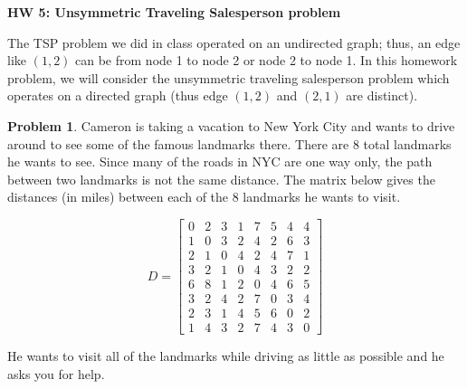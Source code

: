 \documentclass[11pt]{article}
\theoremstyle{definition}
\newtheorem{problem}{Problem}
\begin{document}
\begin{large}
\begin{center}
\textbf{HW 5: Unsymmetric Traveling Salesperson problem}
\end{center}
\end{large}

The TSP problem we did in class operated on an undirected graph; thus, an edge like $(1,2)$ can be from node 1 to node 2 or node 2 to node 1. In this homework problem, we will consider the unsymmetric traveling salesperson problem which operates on a directed graph (thus edge $(1,2)$ and $(2,1)$ are distinct).

\begin{problem}
Cameron is taking a vacation to New York City and wants to drive around to see some of the famous landmarks there. There are 8 total landmarks he wants to see. Since many of the roads in NYC are one way only, the path between two landmarks is not the same distance. The matrix below gives the distances (in miles) between each of the 8 landmarks he wants to visit.

\[
D = 
\begin{bmatrix}
0 & 2 & 3 & 1 & 7 & 5 & 4 & 4\\
1 & 0 & 3 & 2 & 4 & 2 & 6 & 3\\
2 & 1 & 0 & 4 & 2 & 4 & 7 & 1\\
3 & 2 & 1 & 0 & 4 & 3 & 2 & 2\\
6 & 8 & 1 & 2 & 0 & 4 & 6 & 5\\
3 & 2 & 4 & 2 & 7 & 0 & 3 & 4\\
2 & 3 & 1 & 4 & 5 & 6 & 0 & 2\\
1 & 4 & 3 & 2 & 7 & 4 & 3 & 0
\end{bmatrix}
\]

He wants to visit all of the landmarks while driving as little as possible and he asks you for help.
\end{problem}
\end{document}
